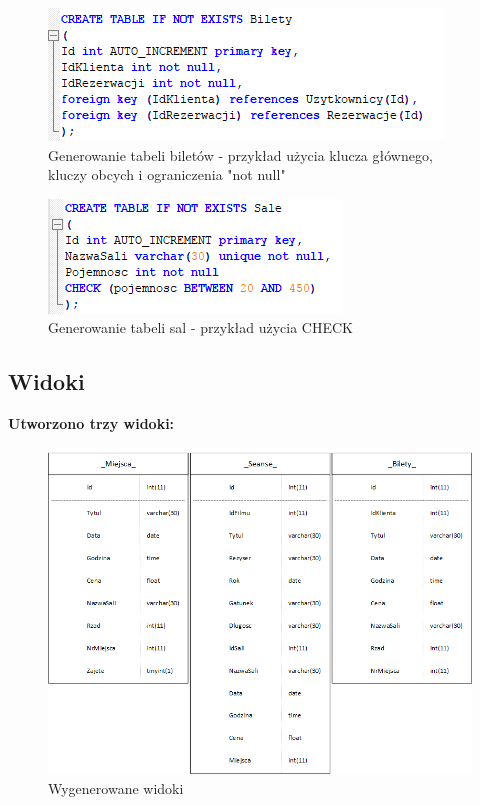 \begin{figure} [H]
	\centering
	\includegraphics[width=0.6\linewidth]{rozdzial04/T_Bilety.png}
	\caption{Generowanie tabeli biletów - przykład użycia klucza głównego, kluczy obcych i ograniczenia "not null"}
	\label{fig:t_bilety}
\end{figure}

\begin{figure} [H]
	\centering
	\includegraphics[width=0.5\linewidth]{rozdzial04/T_Sale.png}
	\caption{Generowanie tabeli sal - przykład użycia CHECK}
	\label{fig:t_sale}
\end{figure}

\subsection{Widoki}

\textbf{Utworzono trzy widoki:}

\begin{figure} [H]
	\centering
	\includegraphics[width=0.8\linewidth]{rozdzial04/widoki.png}
	\caption{Wygenerowane widoki}
	\label{fig:views}
\end{figure}

